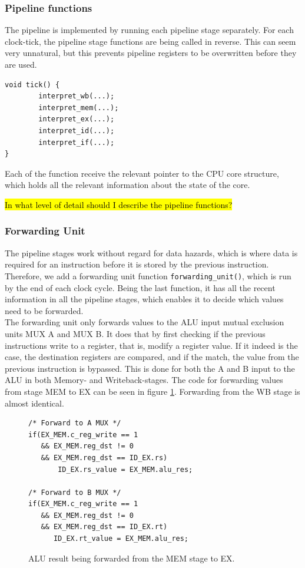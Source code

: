 \subsubsection{Pipeline functions}
The pipeline is implemented by running each pipeline stage separately. For each
clock-tick, the pipeline stage functions are being called in reverse. This can
seem very unnatural, but this prevents pipeline registers to be overwritten
before they are used.
\begin{verbatim}
void tick() {
        interpret_wb(...);
        interpret_mem(...);
        interpret_ex(...);
        interpret_id(...);
        interpret_if(...);
}
\end{verbatim}

Each of the function receive the relevant pointer to the CPU core structure,
which holds all the relevant information about the state of the core.

\hl{In what level of detail should I describe the pipeline functions?}


\subsubsection{Forwarding Unit}
The pipeline stages work without regard for data hazards, which is where data
is required for an instruction before it is stored by the previous instruction.
Therefore, we add a forwarding unit function \texttt{forwarding\_unit()}, which
is run by the end of each clock cycle. Being the last function, it has all the
recent information in all the pipeline stages, which enables it to decide which
values need to be forwarded.\\
The forwarding unit only forwards values to the ALU input mutual exclusion
units MUX A and MUX B. It does that by first checking if the previous
instructions write to a register, that is, modify a register value. If it
indeed is the case, the destination registers are compared, and if the match,
the value from the previous instruction is bypassed. This is done for both the
A and B input to the ALU in both Memory- and Writeback-stages. The code for
forwarding values from stage MEM to EX can be seen in figure
\ref{fig:forwarding_unit_code}. Forwarding from the WB stage is almost
identical.

\begin{figure}
\centering
\begin{lstlisting}[style=customc]
/* Forward to A MUX */
if(EX_MEM.c_reg_write == 1
   && EX_MEM.reg_dst != 0
   && EX_MEM.reg_dst == ID_EX.rs)
       ID_EX.rs_value = EX_MEM.alu_res;

/* Forward to B MUX */
if(EX_MEM.c_reg_write == 1
   && EX_MEM.reg_dst != 0
   && EX_MEM.reg_dst == ID_EX.rt)
      ID_EX.rt_value = EX_MEM.alu_res;
\end{lstlisting}
\label{fig:forwarding_unit_code}
\caption{ALU result being forwarded from the MEM stage to EX.}
\end{figure}


